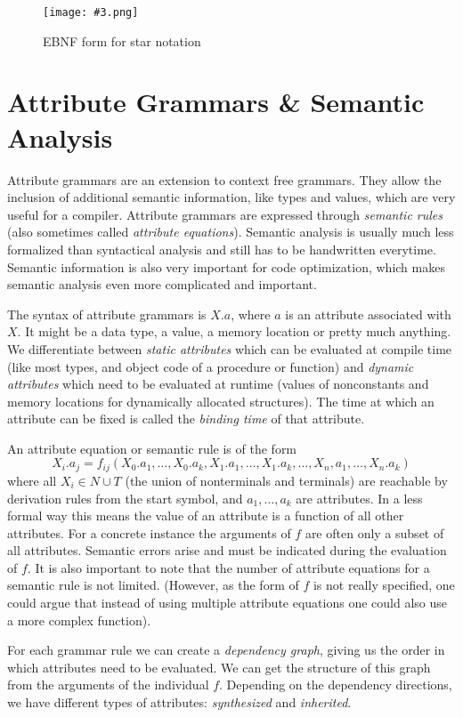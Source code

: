 \documentclass{article}
\newcommand{\fig}[4]{
	\begin{figure}[#1]
		\center
		\texttt{[image: \#3.png]}
		\caption{#4}
		\label{fig:#3}
	\end{figure}
	}
\begin{document}
\fig{h}{0.7}{ebnfstar}{EBNF form for star notation}

\section{Attribute Grammars \& Semantic Analysis}
Attribute grammars are an extension to context free grammars.
They allow the inclusion of additional semantic information, like types and values, which are very useful for a compiler.
Attribute grammars are expressed through \emph{semantic rules} (also sometimes called \emph{attribute equations}).
Semantic analysis is usually much less formalized than syntactical analysis and still has to be handwritten everytime.
Semantic information is also very important for code optimization, which makes semantic analysis even more complicated and important.

The syntax of attribute grammars is $X.a$, where $a$ is an attribute associated with $X$.
It might be a data type, a value, a memory location or pretty much anything.
We differentiate between \emph{static attributes} which can be evaluated at compile time (like most types, and object code of a procedure or function) and \emph{dynamic attributes} which need to be evaluated at runtime (values of nonconstants and memory locations for dynamically allocated structures).
The time at which an attribute can be fixed is called the \emph{binding time} of that attribute.

An attribute equation or semantic rule is of the form
\begin{equation}
	X_i.a_j = f_{ij}(X_0.a_1, \dots, X_0.a_k, X_1.a_1, \dots, X_1.a_k, \dots, X_n, a_1, \dots, X_n.a_k)
\end{equation}
where all $X_i \in N \cup T$ (the union of nonterminals and terminals) are reachable by derivation rules from the start symbol, and $a_1, \dots, a_k$ are attributes.
In a less formal way this means the value of an attribute is a function of all other attributes.
For a concrete instance the arguments of $f$ are often only a subset of all attributes.
Semantic errors arise and must be indicated during the evaluation of $f$.
It is also important to note that the number of attribute equations for a semantic rule is not limited.
(However, as the form of $f$ is not really specified, one could argue that instead of using multiple attribute equations one could also use a more complex function).

For each grammar rule we can create a \emph{dependency graph}, giving us the order in which attributes need to be evaluated.
We can get the structure of this graph from the arguments of the individual $f$.
Depending on the dependency directions, we have different types of attributes: \emph{synthesized} and \emph{inherited}.
\end{document}
